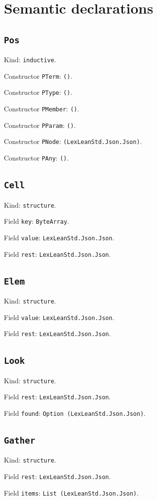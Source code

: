 \documentclass[11pt]{article}
\begin{document}
\section*{Semantic declarations}
\subsection*{\texttt{Pos}}
\noindent Kind: \texttt{inductive}.\par
\noindent Constructor \texttt{PTerm}: \texttt{()}.\par
\noindent Constructor \texttt{PType}: \texttt{()}.\par
\noindent Constructor \texttt{PMember}: \texttt{()}.\par
\noindent Constructor \texttt{PParam}: \texttt{()}.\par
\noindent Constructor \texttt{PNode}: \texttt{(LexLeanStd.Json.Json)}.\par
\noindent Constructor \texttt{PAny}: \texttt{()}.\par
\subsection*{\texttt{Cell}}
\noindent Kind: \texttt{structure}.\par
\noindent Field \texttt{key}: \texttt{ByteArray}.\par
\noindent Field \texttt{value}: \texttt{LexLeanStd.Json.Json}.\par
\noindent Field \texttt{rest}: \texttt{LexLeanStd.Json.Json}.\par
\subsection*{\texttt{Elem}}
\noindent Kind: \texttt{structure}.\par
\noindent Field \texttt{value}: \texttt{LexLeanStd.Json.Json}.\par
\noindent Field \texttt{rest}: \texttt{LexLeanStd.Json.Json}.\par
\subsection*{\texttt{Look}}
\noindent Kind: \texttt{structure}.\par
\noindent Field \texttt{rest}: \texttt{LexLeanStd.Json.Json}.\par
\noindent Field \texttt{found}: \texttt{Option (LexLeanStd.Json.Json)}.\par
\subsection*{\texttt{Gather}}
\noindent Kind: \texttt{structure}.\par
\noindent Field \texttt{rest}: \texttt{LexLeanStd.Json.Json}.\par
\noindent Field \texttt{items}: \texttt{List (LexLeanStd.Json.Json)}.\par
\end{document}

